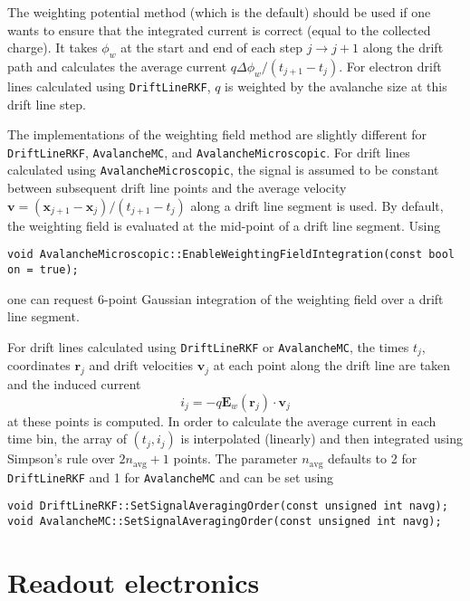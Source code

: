 The weighting potential method (which is the default) 
should be used if one wants to ensure that 
the integrated current is correct (equal to the collected charge).
It takes $\phi_{w}$ at the start and end of each step $j \rightarrow j + 1$ along the drift path
and calculates the average current $q\Delta\phi_{w}/\left(t_{j+1} - t_{j}\right)$. 
For electron drift lines calculated using \texttt{DriftLineRKF}, 
$q$ is weighted by the avalanche size at this drift line step.

The implementations of the weighting field method are slightly different 
for \texttt{DriftLineRKF}, \texttt{AvalancheMC}, and \texttt{AvalancheMicroscopic}.
For drift lines calculated using \texttt{AvalancheMicroscopic}, the signal 
is assumed to be constant between subsequent drift line points 
and the average velocity 
$\mathbf{v} = \left(\mathbf{x}_{j + 1} - \mathbf{x}_{j}\right) / \left(t_{j + 1} - t_{j}\right)$ along a drift line segment is used.
By default, the weighting field is evaluated at the mid-point of a 
drift line segment. 
Using 
\begin{lstlisting}
void AvalancheMicroscopic::EnableWeightingFieldIntegration(const bool on = true);
\end{lstlisting} 
one can request 6-point Gaussian integration of the weighting field 
over a drift line segment.

For drift lines calculated using \texttt{DriftLineRKF} or \texttt{AvalancheMC},
the times $t_j$, coordinates $\mathbf{r}_j$ and drift velocities $\mathbf{v}_j$
at each point along the drift line are taken and the induced current 
\begin{equation*}
  i_{j} = -q \mathbf{E}_{w}\left(\mathbf{r}_{j}\right) \cdot \mathbf{v}_j
\end{equation*}
at these points is computed. In order to calculate the average current 
in each time bin, the array of $\left(t_{j}, i_{j}\right)$ is interpolated 
(linearly) and then integrated using Simpson's rule over $2n_\text{avg} + 1$ points. The parameter $n_\text{avg}$ defaults to 2 for \texttt{DriftLineRKF} 
and 1 for \texttt{AvalancheMC} and can be set using
\begin{lstlisting}
void DriftLineRKF::SetSignalAveragingOrder(const unsigned int navg);
void AvalancheMC::SetSignalAveragingOrder(const unsigned int navg);
\end{lstlisting} 

\section{Readout electronics}

